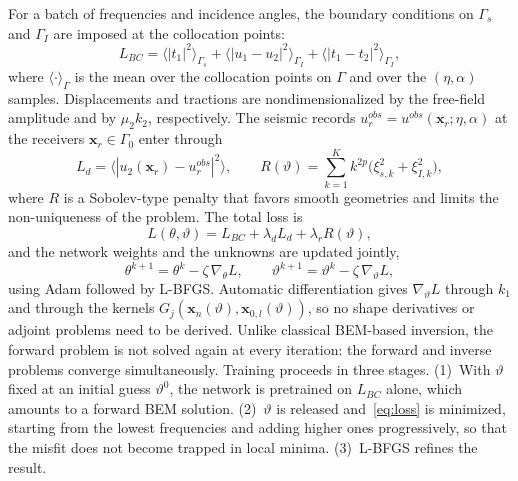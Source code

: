 \documentclass[11pt,twoside]{article}
\begin{document}
For a batch of frequencies and incidence angles, the boundary conditions on
$\Gamma_s$ and $\Gamma_I$ are imposed at the collocation points:
\begin{equation}
  L_{BC} = \bigl\langle |t_1|^2 \bigr\rangle_{\Gamma_s}
  + \bigl\langle |u_1-u_2|^2 \bigr\rangle_{\Gamma_I}
  + \bigl\langle |t_1-t_2|^2 \bigr\rangle_{\Gamma_I},
\end{equation}
where $\langle\cdot\rangle_{\Gamma}$ is the mean over the collocation points on
$\Gamma$ and over the $(\eta,\alpha)$ samples. Displacements and tractions are
nondimensionalized by the free-field amplitude and by $\mu_2 k_2$, respectively.
The seismic records $u^{obs}_r = u^{obs}(\mathbf{x}_r;\eta,\alpha)$ at the
receivers $\mathbf{x}_r\in\Gamma_0$ enter through
\begin{equation}
  L_d = \bigl\langle |u_2(\mathbf{x}_r) - u^{obs}_r|^2 \bigr\rangle,
  \qquad
  R(\vartheta) = \sum_{k=1}^{K} k^{2p}\bigl(\xi_{s,k}^2 + \xi_{I,k}^2\bigr),
\end{equation}
where $R$ is a Sobolev-type penalty that favors smooth geometries and limits the
non-uniqueness of the problem. The total loss is
\begin{equation}\label{eq:loss}
  L(\theta,\vartheta) = L_{BC} + \lambda_d L_d + \lambda_r R(\vartheta),
\end{equation}
and the network weights and the unknowns are updated jointly,
\begin{equation}
  \theta^{k+1} = \theta^k - \zeta\,\nabla_\theta L, \qquad
  \vartheta^{k+1} = \vartheta^k - \zeta\,\nabla_\vartheta L,
\end{equation}
using Adam followed by L-BFGS. Automatic differentiation gives
$\nabla_\vartheta L$ through $k_1$ and through the kernels
$G_j(\mathbf{x}_n(\vartheta),\mathbf{x}_{0,l}(\vartheta))$, so no shape
derivatives or adjoint problems need to be derived. Unlike classical
BEM-based inversion, the forward problem is not solved again at every iteration:
the forward and inverse problems converge simultaneously. Training proceeds in three stages. (1)~With $\vartheta$ fixed at an initial
guess $\vartheta^0$, the network is pretrained on $L_{BC}$ alone, which amounts
to a forward BEM solution. (2)~$\vartheta$ is released and~\eqref{eq:loss} is
minimized, starting from the lowest frequencies and adding higher ones
progressively, so that the misfit does not become trapped in local minima.
(3)~L-BFGS refines the result.

 

\end{document}
